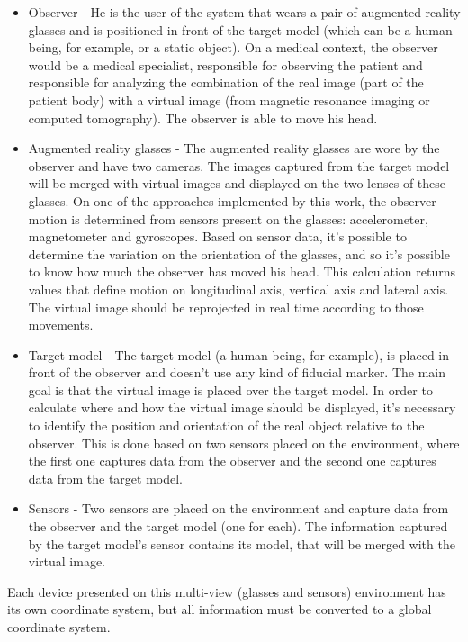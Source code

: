 \documentclass[msc, a4paper, classic, en]{ufbathesis}
\begin{document}
\begin{itemize}
  \item Observer - He is the user of the system that wears a pair of augmented reality glasses and is positioned in front of the target model (which can be a human being, for example, or a static object). On a medical context, the observer would be a medical specialist, responsible for observing the patient and responsible for analyzing the combination of the real image (part of the patient body) with a virtual image (from magnetic resonance imaging or computed tomography). The observer is able to move his head.
  \item Augmented reality glasses - The augmented reality glasses are wore by the observer and have two cameras. The images captured from the target model will be merged with virtual images and displayed on the two lenses of these glasses. On one of the approaches implemented by this work, the observer motion is determined from sensors present on the glasses: accelerometer, magnetometer and gyroscopes. Based on sensor data, it's possible to determine the variation on the orientation of the glasses, and so it's possible to know how much the observer has moved his head. This calculation returns values that define motion on longitudinal axis, vertical axis and lateral axis. The virtual image should be reprojected in real time according to those movements.
  \item Target model - The target model (a human being, for example), is placed in front of the observer and doesn't use any kind of fiducial marker. The main goal is that the virtual image is placed over the target model. In order to calculate where and how the virtual image should be displayed, it's necessary to identify the position and orientation of the real object relative to the observer. This is done based on two sensors placed on the environment, where the first one captures data from the observer and the second one captures data from the target model.
  \item Sensors - Two sensors are placed on the environment and capture data from the observer and the target model (one for each). The information captured by the target model's sensor contains its model, that will be merged with the virtual image.
\end{itemize}

Each device presented on this multi-view (glasses and sensors) environment has its own coordinate system, but all information must be converted to a global coordinate system.
\end{document}
